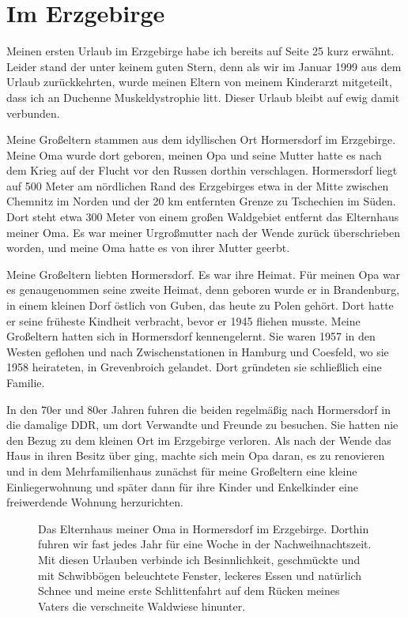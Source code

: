\documentclass[fontsize=14pt,a4paper,headinclude,DIV=calc,automark]{scrbook}
\begin{document}
\section{Im Erzgebirge}

Meinen ersten Urlaub im Erzgebirge habe ich bereits auf Seite 25 kurz erwähnt. Leider stand der unter keinem guten Stern, denn als wir im Januar 1999 aus dem Urlaub zurückkehrten, wurde meinen Eltern von meinem Kinderarzt mitgeteilt, dass ich an Duchenne Muskeldystrophie litt. Dieser Urlaub bleibt auf ewig damit verbunden.

Meine Großeltern stammen aus dem idyllischen Ort Hormersdorf im Erzgebirge. Meine Oma wurde dort geboren, meinen Opa und seine Mutter hatte es nach dem Krieg auf der Flucht vor den Russen dorthin verschlagen. Hormersdorf liegt auf 500 Meter am nördlichen Rand des Erzgebirges etwa in der Mitte zwischen Chemnitz im Norden und der 20 km entfernten Grenze zu Tschechien im Süden. Dort steht etwa 300 Meter von einem großen Waldgebiet entfernt das Elternhaus meiner Oma. Es war meiner Urgroßmutter nach der Wende zurück überschrieben worden, und meine Oma hatte es von ihrer Mutter geerbt.

Meine Großeltern liebten Hormersdorf. Es war ihre Heimat. Für meinen Opa war es genaugenommen seine zweite Heimat, denn geboren wurde er in Brandenburg, in einem kleinen Dorf östlich von Guben, das heute zu Polen gehört. Dort hatte er seine früheste Kindheit verbracht, bevor er 1945 fliehen musste. Meine Großeltern hatten sich in Hormersdorf kennengelernt. Sie waren 1957 in den Westen geflohen und nach Zwischenstationen in Hamburg und Coesfeld, wo sie 1958 heirateten, in Grevenbroich gelandet. Dort gründeten sie schließlich eine Familie.

In den 70er und 80er Jahren fuhren die beiden regelmäßig nach Hormersdorf in die damalige DDR, um dort Verwandte und Freunde zu besuchen. Sie hatten nie den Bezug zu dem kleinen Ort im Erzgebirge verloren. Als nach der Wende das Haus in ihren Besitz über ging, machte sich mein Opa daran, es zu renovieren und in dem Mehrfamilienhaus zunächst für meine Großeltern eine kleine Einliegerwohnung und später dann für ihre Kinder und Enkelkinder eine freiwerdende Wohnung herzurichten.

\setlength{\fboxsep}{0pt}    %
\setlength{\fboxrule}{0.2pt} %
\begin{figure}[ht]
    \raggedright
    \caption{Das Elternhaus meiner Oma in Hormersdorf im Erzgebirge. Dorthin fuhren wir fast jedes Jahr für eine Woche in der Nachweihnachtszeit. Mit diesen Urlauben verbinde ich Besinnlichkeit, geschmückte und mit Schwibbögen beleuchtete Fenster, leckeres Essen und natürlich Schnee und meine erste Schlittenfahrt auf dem Rücken meines Vaters die verschneite Waldwiese hinunter.}
    \label{fig:hormersdorf1}
\end{figure}
\end{document}
